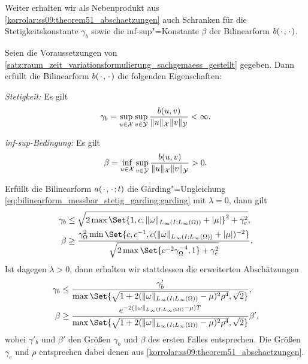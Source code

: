 \documentclass[../main.tex]{subfiles}
\begin{document}
Weiter erhalten wir als Nebenprodukt aus \cref{korrolar:ss09:theorem51_abschaetzungen} auch Schranken für die Stetigkeitskonstante $\gamma_{b}$ sowie die inf-sup"=Konstante $\beta$ der Bilinearform $b({\mkern2mu\cdot\mkern2mu}, {\mkern2mu\cdot\mkern2mu})$.

\begin{Korollar}
\label{korollar:rz_variationsformulierung_stetig_infsup_schranken}
    Seien die Voraussetzungen von \cref{satz:raum_zeit_variationsformulierung_sachgemaess_gestellt} gegeben.
    Dann erfüllt die Bilinearform $b({\mkern2mu\cdot\mkern2mu}, {\mkern2mu\cdot\mkern2mu})$ die folgenden Eigenschaften:
    \begin{thmenumerate}
        \item \emph{Stetigkeit:} Es gilt
            \begin{equation}
                \gamma_{b} = \sup_{u \in \mathcal X} \sup_{v \in \mathcal Y} \frac{b(u, v)}{\lVert u\rVert_{\mathcal X} \lVert v\rVert_{\mathcal Y}} < \infty.
            \end{equation}
        \item \emph{inf-sup-Bedingung:} Es gilt
            \begin{equation}
                \beta = \inf_{u \in \mathcal X} \sup_{v \in \mathcal Y} \frac{b(u, v)}{\lVert u\rVert_{\mathcal X} \lVert v\rVert_{\mathcal Y}} > 0.
            \end{equation}
    \end{thmenumerate}

    Erfüllt die Bilinearform $a({\mkern2mu\cdot\mkern2mu}, {\mkern2mu\cdot\mkern2mu}; t)$ die G\aa{}rding"=Ungleichung \cref{eq:bilinearform_messbar_stetig_garding:garding} mit $\lambda = 0$, dann gilt
    \begin{align}
        \gamma_{b}  &\leq \sqrt{2 \max\Set{ 1, c, \norm{\omega}_{L_{\infty}(I; L_{\infty}(\Omega))} + \abs{\mu} }^{2} + \gamma_{e}^{2} }, \\
        \beta &\geq \frac{\gamma_{\Omega}^{2} \min\Set{c, c^{-1}, c (\norm{\omega}_{L_{\infty}(I; L_{\infty}(\Omega))} + \abs{\mu})^{-2}}}{\sqrt{2 \max\Set{c^{-2}\gamma_{\Omega}^{-4}, 1} + \gamma_{e}^{2}}}.
    \end{align}
    Ist dagegen $\lambda > 0$, dann erhalten wir stattdessen die erweiterten Abschätzungen
    \begin{align}
        \gamma_{b} &\leq \frac{\gamma'_{b}}{\max\Set{\sqrt{1 + 2 (\norm{\omega}_{L_{\infty}(I; L_{\infty}(\Omega))} - \mu)^{2} \rho^{4} }, \sqrt{2}}}, \\
        \beta &\geq \frac{e^{-2(\norm{\omega}_{L_{\infty}(I; L_{\infty}(\Omega))} - \mu) T}}{\max\Set{\sqrt{1 + 2 (\norm{\omega}_{L_{\infty}(I; L_{\infty}(\Omega))} - \mu)^{2} \rho^{4} }, \sqrt{2}}} \beta',
    \end{align}
    wobei $\gamma'_{b}$ und $\beta'$ den Größen $\gamma_{b}$ und $\beta$ des ersten Falles entsprechen.
    Die Größen $\gamma_{e}$ und $\rho$ entsprechen dabei denen aus \cref{korrolar:ss09:theorem51_abschaetzungen}.


\end{Korollar}
\end{document}

